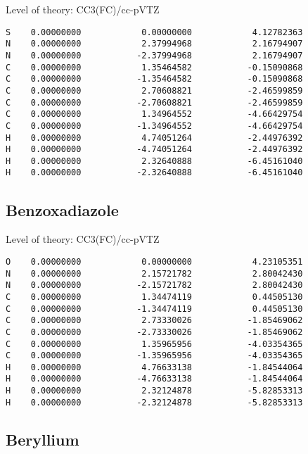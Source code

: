 \documentclass[journal=jctcce,manuscript=article,layout=traditional]{achemso}
\newcommand{\TZ}{cc-pVTZ}
\begin{document}
\begin{singlespace}
Level of theory: CC3(FC)/{\TZ}
\begin{verbatim}
S    0.00000000            0.00000000            4.12782363
N    0.00000000            2.37994968            2.16794907
N    0.00000000           -2.37994968            2.16794907
C    0.00000000            1.35464582           -0.15090868
C    0.00000000           -1.35464582           -0.15090868
C    0.00000000            2.70608821           -2.46599859
C    0.00000000           -2.70608821           -2.46599859
C    0.00000000            1.34964552           -4.66429754
C    0.00000000           -1.34964552           -4.66429754
H    0.00000000            4.74051264           -2.44976392
H    0.00000000           -4.74051264           -2.44976392
H    0.00000000            2.32640888           -6.45161040
H    0.00000000           -2.32640888           -6.45161040
\end{verbatim}
\end{singlespace}

\subsection*{Benzoxadiazole}

\begin{singlespace}
Level of theory: CC3(FC)/{\TZ}
\begin{verbatim}
O    0.00000000            0.00000000            4.23105351
N    0.00000000            2.15721782            2.80042430
N    0.00000000           -2.15721782            2.80042430
C    0.00000000            1.34474119            0.44505130
C    0.00000000           -1.34474119            0.44505130
C    0.00000000            2.73330026           -1.85469062
C    0.00000000           -2.73330026           -1.85469062
C    0.00000000            1.35965956           -4.03354365
C    0.00000000           -1.35965956           -4.03354365
H    0.00000000            4.76633138           -1.84544064
H    0.00000000           -4.76633138           -1.84544064
H    0.00000000            2.32124878           -5.82853313
H    0.00000000           -2.32124878           -5.82853313
\end{verbatim}
\end{singlespace}

\subsection*{Beryllium}
\end{document}
